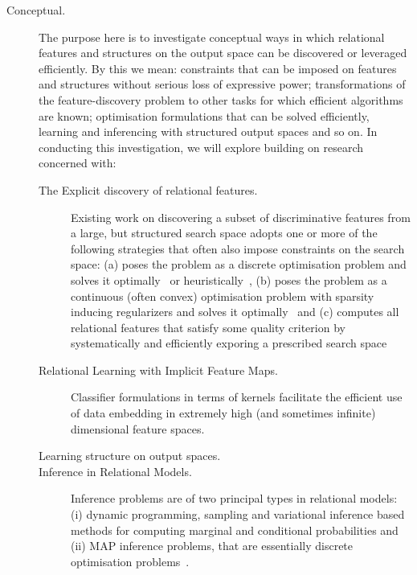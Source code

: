 \documentclass[11pt]{article}
\begin{document}
\begin{description}
    \item[Conceptual.] The purpose here is to investigate conceptual ways in which relational features and structures on the output space can
        be discovered or leveraged efficiently. By this we mean: constraints that can be imposed on features and structures without
        serious loss of expressive power; transformations of the feature-discovery problem to other tasks
        for which efficient algorithms are known; optimisation formulations that can be solved efficiently, learning and inferencing with structured output 
	spaces and so on. In conducting this investigation, we will explore building on research concerned with:
      \begin{description}
       \item[The Explicit discovery of relational features.] Existing work on discovering a subset of discriminative features from a large, but structured search space adopts one or more of the following strategies that often also impose constraints on the search space: (a) poses the problem as a discrete optimisation problem and solves it optimally~\cite{l1Reg,cvpr2007,nips2004} or heuristically~\cite{JoshiRS08,Amrita12,NageshRCKDB12,ChalamallaNSR08,SpeciaSJRN09,RamakrishnanJBS07,SpeciaSRN06}, (b) poses the problem as a continuous (often convex) optimisation problem with sparsity inducing regularizers and solves it optimally~\cite{JawanpuriaNR11,NairSRK12} and (c) computes all relational features that satisfy some quality criterion by systematically and efficiently exporing a prescribed search space~\cite{pei2004,subseqGap2006,bitSpade,antunes2003,han2005,rakesh1995,han2004,gehrke2002,rastogi1999}
       \item[Relational Learning with Implicit Feature Maps.] Classifier formulations in terms of kernels facilitate the efficient use of data embedding in extremely high (and sometimes infinite) dimensional feature spaces. 
       \item[Learning structure on output spaces.]
       \item[Inference in Relational Models.] Inference problems are of two principal types in relational models: (i) dynamic programming, sampling and variational inference based methods for computing marginal and conditional probabilities and (ii) MAP inference problems, that are essentially discrete optimisation problems~\cite{naveen2010,satLPartition}. 
      \end{description}


\end{description}
\end{document}
